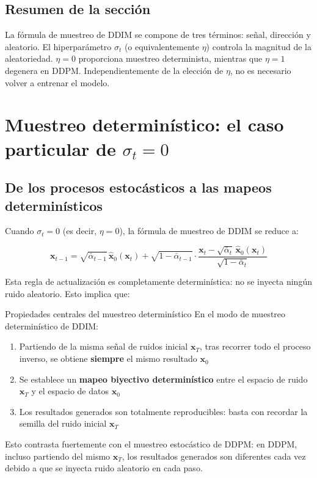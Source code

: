 \documentclass[a4paper]{article}
\begin{document}
\subsection{Resumen de la sección}

La fórmula de muestreo de DDIM se compone de tres términos: señal, dirección y aleatorio. El hiperparámetro $\sigma_t$ (o equivalentemente $\eta$) controla la magnitud de la aleatoriedad. $\eta=0$ proporciona muestreo determinista, mientras que $\eta=1$ degenera en DDPM. Independientemente de la elección de $\eta$, no es necesario volver a entrenar el modelo.
\section{Muestreo determinístico: el caso particular de $\sigma_t = 0$}

\subsection{De los procesos estocásticos a las mapeos determinísticos}

Cuando $\sigma_t = 0$ (es decir, $\eta = 0$), la fórmula de muestreo de DDIM se reduce a:

$$
\mathbf{x}_{t-1} = \sqrt{\bar{\alpha}_{t-1}}\,\hat{\mathbf{x}}_0(\mathbf{x}_t) + \sqrt{1-\bar{\alpha}_{t-1}}\cdot\frac{\mathbf{x}_t - \sqrt{\bar{\alpha}_t}\,\hat{\mathbf{x}}_0(\mathbf{x}_t)}{\sqrt{1-\bar{\alpha}_t}}
$$

Esta regla de actualización es completamente determinística: no se inyecta ningún ruido aleatorio. Esto implica que:

\begin{importantbox}{Propiedades centrales del muestreo determinístico}
En el modo de muestreo determinístico de DDIM:
\begin{enumerate}
    \item Partiendo de la misma señal de ruidos inicial $\mathbf{x}_T$, tras recorrer todo el proceso inverso, se obtiene \textbf{siempre} el mismo resultado $\mathbf{x}_0$
    \item Se establece un \textbf{mapeo biyectivo determinístico} entre el espacio de ruido $\mathbf{x}_T$ y el espacio de datos $\mathbf{x}_0$
    \item Los resultados generados son totalmente reproducibles: basta con recordar la semilla del ruido inicial $\mathbf{x}_T$
\end{enumerate}
Esto contrasta fuertemente con el muestreo estocástico de DDPM: en DDPM, incluso partiendo del mismo $\mathbf{x}_T$, los resultados generados son diferentes cada vez debido a que se inyecta ruido aleatorio en cada paso.
\end{importantbox}
\end{document}
